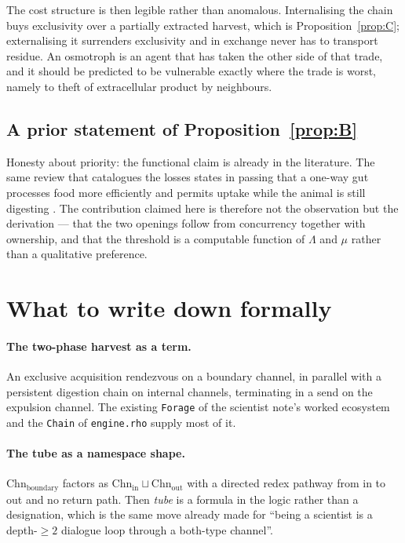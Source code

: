 \documentclass[11pt]{article}
\theoremstyle{plain}
\theoremstyle{definition}
\newcommand{\Chn}{\mathrm{Chn}}
\begin{document}
The cost structure is then legible rather than anomalous. Internalising the chain buys exclusivity
over a partially extracted harvest, which is Proposition~\ref{prop:C}; externalising it surrenders
exclusivity and in exchange never has to transport residue. An osmotroph is an agent that has taken
the other side of that trade, and it should be predicted to be vulnerable exactly where the trade is
worst, namely to theft of extracellular product by neighbours.

\subsection{A prior statement of Proposition~\ref{prop:B}}

Honesty about priority: the functional claim is already in the literature. The same review that
catalogues the losses states in passing that a one-way gut processes food more efficiently and permits
uptake while the animal is still digesting \cite{hejnol2015}. The contribution claimed here is
therefore not the observation but the derivation --- that the two openings follow from concurrency
together with ownership, and that the threshold is a computable function of $\Lambda$ and $\mu$ rather
than a qualitative preference.

\section{What to write down formally}
\label{sec:formal}

\paragraph{The two-phase harvest as a term.} An exclusive acquisition rendezvous on a boundary
channel, in parallel with a persistent digestion chain on internal channels, terminating in a send on
the expulsion channel. The existing \texttt{Forage} of the scientist note's worked ecosystem and the
\texttt{Chain} of \texttt{engine.rho} supply most of it.

\paragraph{The tube as a namespace shape.} $\Chn_{\mathrm{boundary}}$ factors as
$\Chn_{\mathrm{in}} \sqcup \Chn_{\mathrm{out}}$ with a directed redex pathway from in to out and no
return path. Then \emph{tube} is a formula in the logic rather than a designation, which is the same
move already made for ``being a scientist is a depth-$\geq 2$ dialogue loop through a both-type
channel''.
\end{document}
